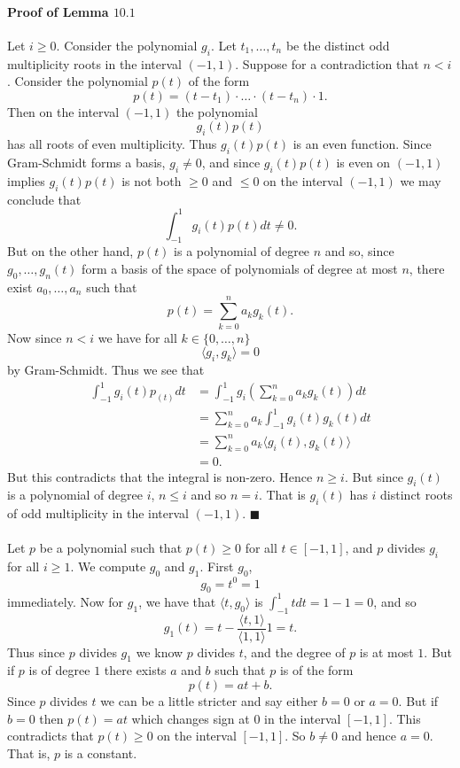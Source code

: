 \documentclass[letterpaper,12pt,oneside,onecolumn]{article}
\newcommand{\1}{\mathbbm{1}}
\begin{document}
\paragraph{Proof of Lemma $10.1$}
Let $i \geq 0$. Consider the polynomial $g_i$. Let $t_1, \dots, t_n$ be the distinct odd multiplicity roots in the interval $(-1,1)$. Suppose for a contradiction that $n < i$. Consider the polynomial $p(t)$ of the form
$$p(t) = (t-t_1)\cdot \dots \cdot(t-t_n)\cdot 1.$$
Then on the interval $(-1,1)$ the polynomial
$$g_i(t)p(t)$$
has all roots of even multiplicity. Thus $g_i(t)p(t)$ is an even function. Since Gram-Schmidt forms a basis, $g_i \neq 0$, and since $g_i(t)p(t)$ is even on $(-1, 1)$ implies $g_i(t)p(t)$ is not both $\geq 0$ and $\leq 0$ on the interval $(-1,1)$ we may conclude that
$$\int_{-1}^1 g_i(t)p(t) dt \neq 0.$$
But on the other hand, $p(t)$ is a polynomial of degree $n$ and so, since $g_0, \dots, g_{n}(t)$ form a basis of the space of polynomials of degree at most $n$, there exist $a_0, \dots, a_n$ such that
$$p(t) = \sum_{k=0}^n a_k g_k(t).$$
Now since $n < i$ we have for all $k \in \{0,\dots, n\}$
$$\langle g_i, g_k \rangle = 0$$
by Gram-Schmidt. Thus we see that
\begin{align*}
\int_{-1}^1 g_i(t)p_(t) dt &= \int_{-1}^1 g_i(\sum_{k=0}^n a_k g_k(t)) dt\\
&= \sum_{k=0}^n a_k \int_{-1}^1 g_i(t)g_k(t) dt\\
&= \sum_{k=0}^n a_k \langle g_i(t), g_k(t) \rangle\\
&= 0.\end{align*}
But this contradicts that the integral is non-zero. Hence $n \geq i$. But since $g_i(t)$ is a polynomial of degree $i$, $n \leq i$ and so $n=i$. That is $g_i(t)$ has $i$ distinct roots of odd multiplicity in the interval $(-1,1)$. $\blacksquare$
\paragraph{}
Let $p$ be a polynomial such that $p(t) \geq 0$ for all $t \in [-1,1]$, and $p$ divides $g_i$ for all $i \geq 1$. We compute $g_0$ and $g_1$. First $g_0$,
$$g_0 = t^0 = 1 $$
immediately. Now for $g_1$, we have that $\langle t, g_0 \rangle$ is $\int_{-1}^1 t dt = 1 - 1 = 0$, and so
$$g_1(t) = t - \frac{\langle t, 1\rangle}{\langle 1, 1\rangle} 1 = t.$$
Thus since $p$ divides $g_1$ we know $p$ divides $t$, and the degree of $p$ is at most $1$. But if $p$ is of degree $1$ there exists $a$ and $b$ such that $p$ is of the form
$$p(t) = at + b.$$
Since $p$ divides $t$ we can be a little stricter and say either $b=0$ or $a=0$. But if $b=0$ then $p(t) = at$ which changes sign at $0$ in the interval $[-1,1]$. This contradicts that $p(t) \geq 0$ on the interval $[-1,1]$. So $b \neq 0$ and hence $a=0$. That is, $p$ is a constant.
\end{document}
